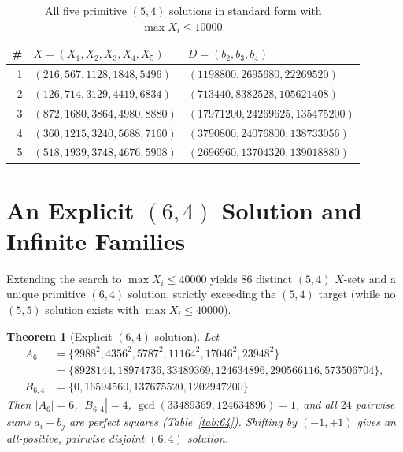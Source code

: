 \documentclass[11pt]{article}
\newtheorem{theorem}{Theorem}
\begin{document}
\begin{table}[ht]
\centering
\caption{All five primitive $(5, 4)$ solutions in standard form with $\max X_i \le 10000$.}
\label{tab:five}
\begin{tabular}{rll}
\toprule
\# & $X = (X_1, X_2, X_3, X_4, X_5)$ & $D = (b_2, b_3, b_4)$ \\
\midrule
1 & $(216, 567, 1128, 1848, 5496)$  & $(1198800, 2695680, 22269520)$ \\
2 & $(126, 714, 3129, 4419, 6834)$  & $(713440, 8382528, 105621408)$ \\
3 & $(872, 1680, 3864, 4980, 8880)$ & $(17971200, 24269625, 135475200)$ \\
4 & $(360, 1215, 3240, 5688, 7160)$ & $(3790800, 24076800, 138733056)$ \\
5 & $(518, 1939, 3748, 4676, 5908)$ & $(2696960, 13704320, 139018880)$ \\
\bottomrule
\end{tabular}
\end{table}

\section{An Explicit \texorpdfstring{$(6, 4)$}{(6, 4)} Solution and Infinite Families}

Extending the search to $\max X_i \le 40000$ yields $86$ distinct $(5, 4)$ $X$-sets and a unique primitive $(6, 4)$ solution, strictly exceeding the $(5, 4)$ target (while no $(5, 5)$ solution exists with $\max X_i \le 40000$).

\begin{theorem}[Explicit $(6, 4)$ solution]\label{thm:64}
Let
\begin{align*}
A_6 &= \{2988^2, 4356^2, 5787^2, 11164^2, 17046^2, 23948^2\} \\
    &= \{8928144, 18974736, 33489369, 124634896, 290566116, 573506704\}, \\
B_{6,4} &= \{0, 16594560, 137675520, 1202947200\}.
\end{align*}
Then $|A_6| = 6$, $|B_{6,4}| = 4$, $\gcd(33489369, 124634896) = 1$, and all $24$ pairwise sums $a_i + b_j$ are perfect squares (Table~\ref{tab:64}). Shifting by $(-1, +1)$ gives an all-positive, pairwise disjoint $(6, 4)$ solution.
\end{theorem}
\end{document}
